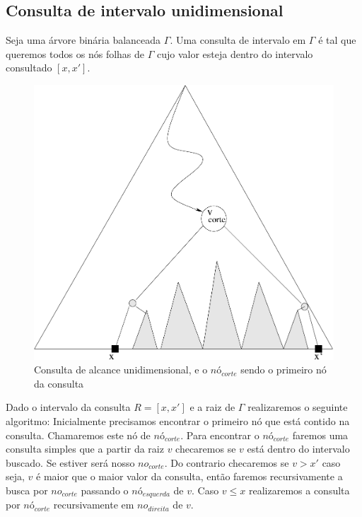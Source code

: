 \subsection{Consulta de intervalo unidimensional}

Seja uma árvore binária balanceada $\Gamma$. Uma consulta de intervalo em $\Gamma$ é tal que queremos
todos os nós folhas de $\Gamma$ cujo valor esteja dentro do intervalo consultado $[x, x']$.

\begin{figure}[h]
    \begin{center}
        \includegraphics[scale=0.4]{images/range_tree2.pdf}
    \end{center}
    \caption{Consulta de alcance unidimensional, e o $nó_{corte}$ sendo o primeiro nó da consulta}
\end{figure}


Dado o intervalo da consulta $R = [x , x']$ e a raiz de $\Gamma$ realizaremos o seguinte algoritmo:
Inicialmente precisamos encontrar o primeiro nó que está contido na consulta. Chamaremos este nó de $nó_{corte}$.
Para encontrar o $nó_{corte}$ faremos uma consulta simples que a partir da raiz $v$ checaremos se $v$
está dentro do intervalo buscado. Se estiver será nosso $no_{corte}$. Do contrario checaremos se $v > x'$
caso seja, $v$ é maior que o maior valor da consulta, então faremos recursivamente a busca por $no_{corte}$
passando o $nó_{esquerda}$ de $v$. Caso $v \leq x$ realizaremos a consulta por $nó_{corte}$ recursivamente
em $no_{direita}$ de $v$.


